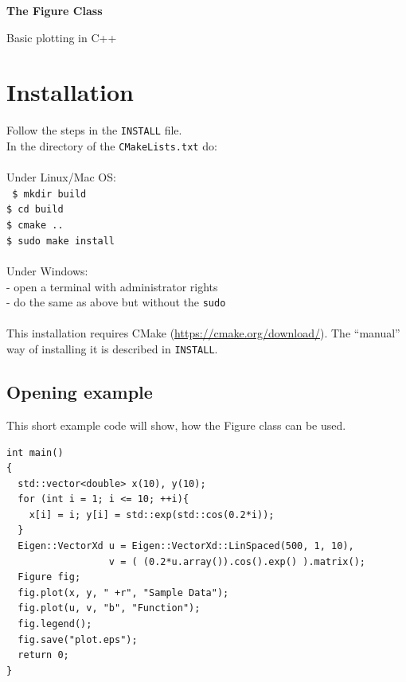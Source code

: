 \documentclass[a4paper]{article}
\begin{document}
\begin{center}
  \begin{huge}
    \textbf{The Figure Class\\}
  \end{huge}
  Basic plotting in C++
\end{center}
  
\vspace*{3cm}
  \tableofcontents
\vspace*{\fill}

\newpage
{}
\section{Installation}

Follow the steps in the \texttt{INSTALL} file. \\
In the directory of the \texttt{CMakeLists.txt} do: \\ \\
Under Linux/Mac OS: \\
\texttt{
\indent   \$ mkdir build \\
\indent   \$ cd build \\
\indent   \$ cmake .. \\
\indent   \$ sudo make install \\ \\
}
Under Windows: \\
\indent    - open a terminal with administrator rights \\
\indent    - do the same as above but without the \texttt{sudo} \\ \\
%
This installation requires CMake (\url{https://cmake.org/download/}). 
The ``manual'' way of installing it is described in \texttt{INSTALL}.

\subsection{Opening example}

This short example code will show, how the Figure class can be used.
\begin{lstlisting}
int main()
{
  std::vector<double> x(10), y(10);
  for (int i = 1; i <= 10; ++i){ 
    x[i] = i; y[i] = std::exp(std::cos(0.2*i));
  }
  Eigen::VectorXd u = Eigen::VectorXd::LinSpaced(500, 1, 10),
                  v = ( (0.2*u.array()).cos().exp() ).matrix();
  Figure fig;
  fig.plot(x, y, " +r", "Sample Data");
  fig.plot(u, v, "b", "Function");
  fig.legend();
  fig.save("plot.eps");
  return 0;
}
\end{lstlisting}
\end{document}
